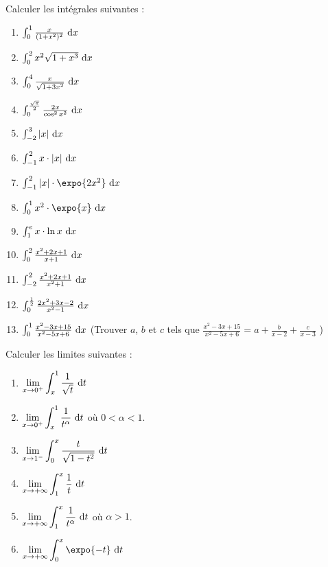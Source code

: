 %
\begin{exo}
      Calculer les int\'egrales suivantes : 
      \begin{enumerate}
            \item $ \int_{0}^{1} \frac{x}{(1+x^2)^2} ~\mathrm{d}x $
            \item $ \int_{0}^{2} x^2 \sqrt{1+x^3} ~\mathrm{d}x $
            \item $ \int_{0}^{4} \frac{x}{\sqrt{1+3x^2}} ~\mathrm{d}x $
            \item $ \int_{0}^{ \frac{ \sqrt{ \pi } }{2} } \frac{2x}{ \cos ^2 x^2 } ~\mathrm{d}x $
            \item $ \int_{-2}^{3} |x| ~\mathrm{d}x $
            \item $ \int_{-1}^{2} x \cdot |x| ~\mathrm{d}x $
            \item $ \int_{-1}^{2} |x| \cdot \expo{2x^2} \dx $
            \item $ \int_{0}^{1} x^2 \cdot \expo{x} \dx $
            \item $ \int_{1}^{e} x \cdot \ln x ~\mathrm{d}x  $
            \item $ \int_{0}^{2} \frac{x^2 + 2x + 1}{x+1} ~\mathrm{d}x $
            \item $ \int_{-2}^{2} \frac{x^2 + 2x + 1}{x^2 + 1} ~\mathrm{d}x $
            \item $ \int_{0}^{\frac{1}{2}} \frac{2x^2 + 3x -2}{x^2-1} ~\mathrm{d}x $
            \item $ \int_{0}^{1} \frac{x^2 - 3x + 15}{x^2 -5x +6} ~\mathrm{d}x $ 
                  (Trouver $a$, $b$ et $c$ tels que
                  $ \frac{x^2 - 3x + 15}{x^2 -5x +6} = a+\frac{b}{x-2}+\frac{c}{x-3} $
                  )
      \end{enumerate}
\end{exo}
%
\begin{exo}
      Calculer les limites suivantes : 
      \begin{enumerate}
            \item $\displaystyle{ \lim_{x\rightarrow 0^+} \int_{x}^{1} \frac{1}{\sqrt{t}} ~\mathrm{d}t}$
            \item $\displaystyle{ \lim_{x\rightarrow 0^+} \int_{x}^{1} \frac{1}{t^{\alpha}} ~\mathrm{d}t}$ o\`u $0 < \alpha < 1$.
            \item $\displaystyle{ \lim_{x\rightarrow 1^-} \int_{0}^{x} \frac{t}{\sqrt{1-t^2}} ~\mathrm{d}t}$
            \item $\displaystyle{ \lim_{x\rightarrow +\infty} \int_{1}^{x} \frac{1}{t} ~\mathrm{d}t}$
            \item $\displaystyle{ \lim_{x\rightarrow +\infty} \int_{1}^{x} \frac{1}{t^{\alpha}} ~\mathrm{d}t}$ o\`u $\alpha > 1$.
            \item $\displaystyle{ \lim_{x\rightarrow +\infty} \int_{0}^{x} \expo{-t} \dt}$
      \end{enumerate}
\end{exo}
